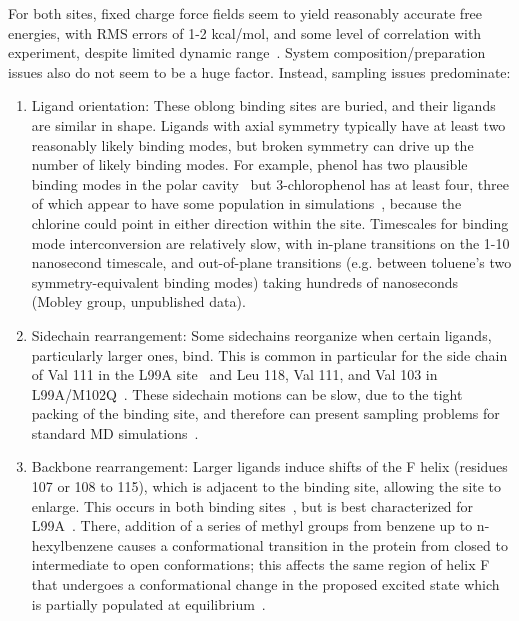 \documentclass[aps,pre,twocolumn,nofootinbib,superscriptaddress,10pt, final,tightenlines]{revtex4-1}
\begin{document}
For both sites, fixed charge force fields seem to yield reasonably accurate free energies, with RMS errors of 1-2 kcal/mol, and some level of correlation with experiment, despite limited dynamic range~\cite{deng_calculation_2006, mobley_predicting_2007, boyce_predicting_2009, gallicchio_binding_2010, wang_identifying_2013}. 
System composition/preparation issues also do not seem to be a huge factor.
Instead, sampling issues predominate:
\begin{enumerate}

\item{Ligand orientation: These oblong binding sites are buried, and their ligands are similar in shape. 
Ligands with axial symmetry typically have at least two reasonably likely binding modes, but broken symmetry can drive up the number of likely binding modes. 
For example, phenol has two plausible binding modes in the polar cavity~\cite{graves_rescoring_2008, boyce_predicting_2009} but 3-chlorophenol has at least four, three of which appear to have some population in simulations~\cite{gallicchio_binding_2010}, because the chlorine could point in either direction within the site. 
Timescales for binding mode interconversion are relatively slow, with in-plane transitions on the 1-10 nanosecond timescale, and out-of-plane transitions (e.g. between toluene's two symmetry-equivalent binding modes) taking hundreds of nanoseconds (Mobley group, unpublished data).}

\item{Sidechain rearrangement: Some sidechains reorganize when certain ligands, particularly larger ones, bind. 
This is common in particular for the side chain of Val 111 in the L99A site~\cite{morton_specificity_1995, mobley_confine_2007, jiang_free_2010} and Leu 118, Val 111, and Val 103 in L99A/M102Q~\cite{wei_model_2002, wei_testing_2004, graves_rescoring_2008, boyce_predicting_2009}. 
These sidechain motions can be slow, due to the tight packing of the binding site, and therefore can present sampling problems for standard MD simulations~\cite{mobley_confine_2007, mobley_predicting_2007, boyce_predicting_2009, jiang_free_2010, wang_achieving_2012}.
}

\item{Backbone rearrangement: 
Larger ligands induce shifts of the F helix (residues 107 or 108 to 115), which is  adjacent to the binding site, allowing the site to enlarge.
This occurs in both binding sites~\cite{wei_testing_2004, boyce_predicting_2009, merski_homologous_2015}, but is best characterized for L99A~\cite{merski_homologous_2015}.
There, addition of a series of methyl groups from benzene up to n-hexylbenzene causes a conformational transition in the protein from closed to intermediate to open conformations; this affects the same region of helix F that undergoes a conformational change in the proposed excited state which is partially populated at equilibrium~\cite{Bouvignies:2011:Nature}.
}
\end{enumerate}
\end{document}
